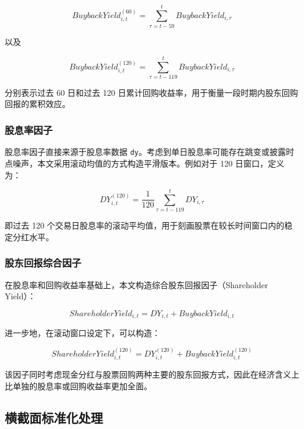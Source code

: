\documentclass[a4paper,10pt]{article}
\begin{document}
\begin{equation}
BuybackYield^{(60)}_{i,t} = \sum_{\tau=t-59}^{t} BuybackYield_{i,\tau}
\end{equation}

以及

\begin{equation}
BuybackYield^{(120)}_{i,t} = \sum_{\tau=t-119}^{t} BuybackYield_{i,\tau}
\end{equation}

分别表示过去 60 日和过去 120 日累计回购收益率，用于衡量一段时期内股东回购回报的累积效应。

\subsubsection{股息率因子}

股息率因子直接来源于股息率数据 \texttt{dy}。考虑到单日股息率可能存在跳变或披露时点噪声，本文采用滚动均值的方式构造平滑版本。例如对于 120 日窗口，定义为：

\begin{equation}
DY^{(120)}_{i,t} = \frac{1}{120} \sum_{\tau=t-119}^{t} DY_{i,\tau}
\end{equation}

即过去 120 个交易日股息率的滚动平均值，用于刻画股票在较长时间窗口内的稳定分红水平。

\subsubsection{股东回报综合因子}

在股息率和回购收益率基础上，本文构造综合股东回报因子（Shareholder Yield）：

\begin{equation}
ShareholderYield_{i,t} = DY_{i,t} + BuybackYield_{i,t}
\end{equation}

进一步地，在滚动窗口设定下，可以构造：

\begin{equation}
ShareholderYield^{(120)}_{i,t} = DY^{(120)}_{i,t} + BuybackYield^{(120)}_{i,t}
\end{equation}

该因子同时考虑现金分红与股票回购两种主要的股东回报方式，因此在经济含义上比单独的股息率或回购收益率更加全面。

\subsection{横截面标准化处理}
\end{document}
